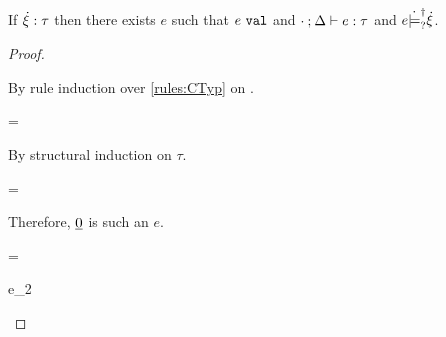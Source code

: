 \begin{lemma}
  \label{lem:exist-val-satormay-hxi}
  If $\dot{\xi} : \tau$ then there exists $e$ such that $e ~\mathtt{val}$ and $\cdot \mathbin{;} \Delta \vdash e : \tau$ and $e \dot{\models}_{?}^{\dag} \dot{\xi}$.
\end{lemma}
\begin{proof}
  \begin{pfsteps}
  \item \ctyp{\hxi}{\tau}  
  \end{pfsteps}
  By rule induction over \ref{rules:CTyp} on .
  \begin{byCases}
  \item[\text{(\ref{rule:CTTruth})}]
    \begin{pfsteps}
    \item \hxi=\ctruth {}
    \end{pfsteps}
    By structural induction on $\tau$.
    \begin{byCases}
    \item[\tau=\tnum]
      \begin{pfsteps}
      \item {} 
      \item {}  
      \item {}  
      \item {} 
      \end{pfsteps}
      Therefore, $\underline{0}$ is such an $e$.
    \item[\tau=\tarr{\tau_1}{\tau_2}]
      \begin{pfsteps}
      \item {}  
      \item {} e_2  
      \item {} 
      \item {}  
      \item

\end{pfsteps}
\end{byCases}
\end{byCases}
\end{proof}
